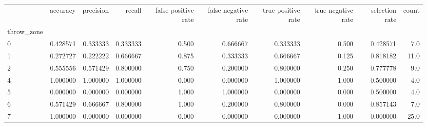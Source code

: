 \begin{tabular}{lrrrrrrrrr}
\toprule
{} &  accuracy &  precision &    recall &  false positive rate &  false negative rate &  true positive rate &  true negative rate &  selection rate &  count \\
throw\_zone &           &            &           &                      &                      &                     &                     &                 &        \\
\midrule
0          &  0.428571 &   0.333333 &  0.333333 &                0.500 &             0.666667 &            0.333333 &               0.500 &        0.428571 &    7.0 \\
1          &  0.272727 &   0.222222 &  0.666667 &                0.875 &             0.333333 &            0.666667 &               0.125 &        0.818182 &   11.0 \\
2          &  0.555556 &   0.571429 &  0.800000 &                0.750 &             0.200000 &            0.800000 &               0.250 &        0.777778 &    9.0 \\
4          &  1.000000 &   1.000000 &  1.000000 &                0.000 &             0.000000 &            1.000000 &               1.000 &        0.500000 &    4.0 \\
5          &  0.000000 &   0.000000 &  0.000000 &                1.000 &             1.000000 &            0.000000 &               0.000 &        0.500000 &    4.0 \\
6          &  0.571429 &   0.666667 &  0.800000 &                1.000 &             0.200000 &            0.800000 &               0.000 &        0.857143 &    7.0 \\
7          &  1.000000 &   0.000000 &  0.000000 &                0.000 &             0.000000 &            0.000000 &               1.000 &        0.000000 &   25.0 \\
\bottomrule
\end{tabular}
